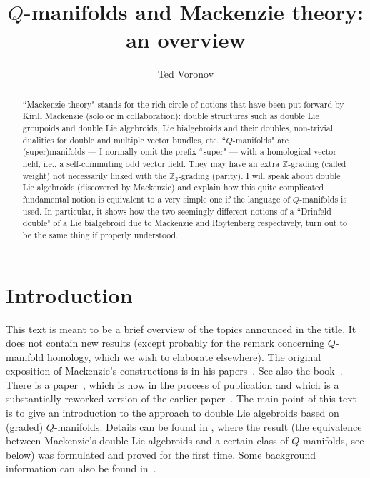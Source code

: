 \documentclass[12pt,reqno,a4paper]{amsart}
\author{Ted Voronov}
\title[$Q$-manifolds and Mackenzie theory]{$Q$-manifolds and Mackenzie theory: an overview}
\theoremstyle{definition}
\begin{document}
\begin{abstract}
``Mackenzie theory" stands for the rich circle of notions that have been put forward by Kirill Mackenzie (solo or in collaboration): double structures such as double Lie groupoids and double Lie algebroids, Lie bialgebroids and their doubles, non-trivial dualities for double and multiple vector bundles, etc. ``$Q$-manifolds" are (super)manifolds --- I normally omit the prefix ``super" --- with a homological vector field, i.e., a self-commuting odd vector field. They may have an extra $\mathbb{Z}$-grading (called weight) not necessarily linked with the $\mathbb{Z}_2$-grading (parity). I will speak about double Lie algebroids (discovered by Mackenzie) and explain how this quite complicated fundamental notion is equivalent to a very simple one if the language of $Q$-manifolds is used. In particular, it shows how the two seemingly different notions of a ``Drinfeld double" of a Lie bialgebroid due to Mackenzie and Roytenberg respectively, turn out to be the same thing if properly understood.
\end{abstract}

\maketitle \tableofcontents

\section{Introduction}

This text is meant to be a brief overview of the topics announced in the title. It  does not contain new results (except probably for the remark concerning  $Q$-manifold homology, which we wish to elaborate elsewhere). The original exposition of Mackenzie's constructions is in his papers~\cite{mackenzie:secondorder1, mackenzie:bialg, mackenzie:secondorder2, mackenzie:doublealg, mackenzie:doublealg2, mackenzie:drinfeld,  mackenzie:sympldouble, mackenzie:notions, mackenzie:diffeomorphisms, mackenzie:duality}. See also the book~\cite{mackenzie:book2005}. There is a paper~\cite{mackenzie:ehresman}, which is now in the process of publication and which is a substantially reworked version of the earlier paper~\cite{mackenzie:notions}.
The main point of this text is to give an introduction to the approach to double Lie algebroids based on (graded) $Q$-manifolds. Details can be found in \cite{tv:double}, where the result (the equivalence between Mackenzie's double Lie algebroids and a certain class of $Q$-manifolds, see below) was formulated and proved for the first time. Some background information can also be found in~\cite{tv:graded}.
\end{document}
